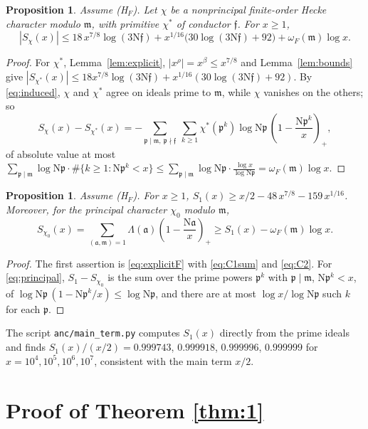 \documentclass[11pt]{article}
\newtheorem{proposition}[lemma]{Proposition}
\theoremstyle{definition}
\theoremstyle{remark}
\numberwithin{equation}{section}
\newcommand{\fa}{\mathfrak a}
\newcommand{\fp}{\mathfrak p}
\newcommand{\fm}{\mathfrak m}
\newcommand{\ff}{\mathfrak f}
\newcommand{\Nm}{\mathrm N}
\newcommand{\pos}[1]{\left(#1\right)_+}
\newcommand{\HF}{\textup{(H$_F$)}}
\begin{document}
\begin{proposition}\label{prop:A}
Assume \HF. Let $\chi$ be a nonprincipal finite-order Hecke character modulo $\fm$, with primitive $\chi^*$ of conductor $\ff$. For $x\ge1$,
\[
 |S_\chi(x)|\le18\,x^{7/8}\log(3\Nm\ff)+x^{1/16}\bigl(30\log(3\Nm\ff)+92\bigr)+\omega_F(\fm)\log x .
\]
\end{proposition}

\begin{proof}
For $\chi^*$, Lemma~\ref{lem:explicit}, $|x^\rho|=x^\beta\le x^{7/8}$ and Lemma~\ref{lem:bounds} give $|S_{\chi^*}(x)|\le18x^{7/8}\log(3\Nm\ff)+x^{1/16}(30\log(3\Nm\ff)+92)$. By \eqref{eq:induced}, $\chi$ and $\chi^*$ agree on ideals prime to $\fm$, while $\chi$ vanishes on the others; so
\[
 S_\chi(x)-S_{\chi^*}(x)=-\sum_{\fp\mid\fm,\ \fp\nmid\ff}\ \sum_{k\ge1}\chi^*(\fp^k)\log\Nm\fp\,\pos{1-\frac{\Nm\fp^k}{x}},
\]
of absolute value at most $\sum_{\fp\mid\fm}\log\Nm\fp\cdot\#\{k\ge1:\Nm\fp^k<x\}\le\sum_{\fp\mid\fm}\log\Nm\fp\cdot\frac{\log x}{\log\Nm\fp}=\omega_F(\fm)\log x$.
\end{proof}

\begin{proposition}\label{prop:B}
Assume \HF. For $x\ge1$, $S_1(x)\ge x/2-48\,x^{7/8}-159\,x^{1/16}$. Moreover, for the principal character $\chi_0$ modulo $\fm$,
\begin{equation}\label{eq:principal}
 S_{\chi_0}(x)=\sum_{(\fa,\fm)=1}\Lambda(\fa)\pos{1-\frac{\Nm\fa}{x}}\ge S_1(x)-\omega_F(\fm)\log x .
\end{equation}
\end{proposition}

\begin{proof}
The first assertion is \eqref{eq:explicitF} with \eqref{eq:C1sum} and \eqref{eq:C2}. For \eqref{eq:principal}, $S_1-S_{\chi_0}$ is the sum over the prime powers $\fp^k$ with $\fp\mid\fm$, $\Nm\fp^k<x$, of $\log\Nm\fp\,(1-\Nm\fp^k/x)\le\log\Nm\fp$, and there are at most $\log x/\log\Nm\fp$ such $k$ for each $\fp$.
\end{proof}

The script \texttt{anc/main\_term.py} computes $S_1(x)$ directly from the prime ideals and finds $S_1(x)/(x/2)=0.999743$, $0.999918$, $0.999996$, $0.999999$ for $x=10^4,10^5,10^6,10^7$, consistent with the main term $x/2$.

\section{Proof of Theorem \texorpdfstring{\ref{thm:1}}{1}}\label{sec:thm1}
\end{document}

